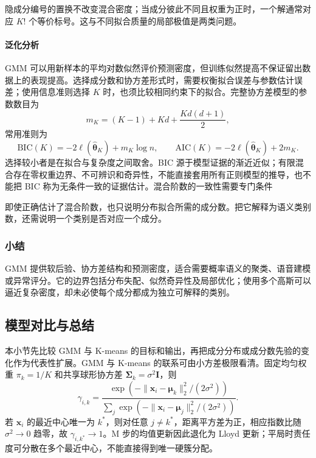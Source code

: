 隐成分编号的置换不改变混合密度；当成分彼此不同且权重为正时，一个解通常对应 $K!$ 个等价标号。这与不同拟合质量的局部极值是两类问题。

\paragraph{泛化分析}
GMM 可以用新样本的平均对数似然评价预测密度，但训练似然提高不保证留出数据上的表现提高。选择成分数和协方差形式时，需要权衡拟合误差与参数估计误差；使用信息准则选择 $K$ 时，也须比较相同约束下的拟合。完整协方差模型的参数数目为
\[
 m_K=(K-1)+Kd+\frac{Kd(d+1)}{2},
\]
常用准则为
\begin{equation}
 \mathrm{BIC}(K)=-2\ell(\hat{\bm{\theta}}_K)+m_K\log n,
 \qquad
 \mathrm{AIC}(K)=-2\ell(\hat{\bm{\theta}}_K)+2m_K.
 \label{eq:clustering-bic}
\end{equation}
选择较小者是在拟合与复杂度之间取舍。BIC 源于模型证据的渐近近似；有限混合存在零权重边界、不可辨识和奇异性，不能直接套用所有正则模型的推导，也不能把 BIC 称为无条件一致的证据估计。混合阶数的一致性需要专门条件

即使正确估计了混合阶数，也只说明分布拟合所需的成分数。把它解释为语义类别数，还需说明一个类别是否对应一个成分。

\subsubsection{小结}

GMM 提供软后验、协方差结构和预测密度，适合需要概率语义的聚类、语音建模或异常评分。它的边界包括分布失配、似然奇异性及局部优化；使用多个高斯可以逼近复杂密度，却未必使每个成分都成为独立可解释的类别。

\subsection{模型对比与总结}

本小节先比较 GMM 与 K-means 的目标和输出，再把成分分布或成分数先验的变化作为代表性扩展。GMM 与 K-means 的联系可由小方差极限看清。固定均匀权重 $\pi_k=1/K$ 和共享球形协方差 $\bm{\Sigma}_k=\sigma^2\bm{I}$，则
\[
 \gamma_{i,k}=
 \frac{\exp(-\lVert\bm{x}_i-\bm{\mu}_k\rVert_2^2/(2\sigma^2))}
 {\sum_j\exp(-\lVert\bm{x}_i-\bm{\mu}_j\rVert_2^2/(2\sigma^2))}.
\]
若 $\bm{x}_i$ 的最近中心唯一为 $k^\ast$，则对任意 $j\ne k^\ast$，距离平方差为正，相应指数比随 $\sigma^2\to0$ 趋零，故 $\gamma_{i,k^\ast}\to1$。M 步的均值更新因此退化为 Lloyd 更新；平局时责任度可分散在多个最近中心，不能直接得到唯一硬簇分配。

